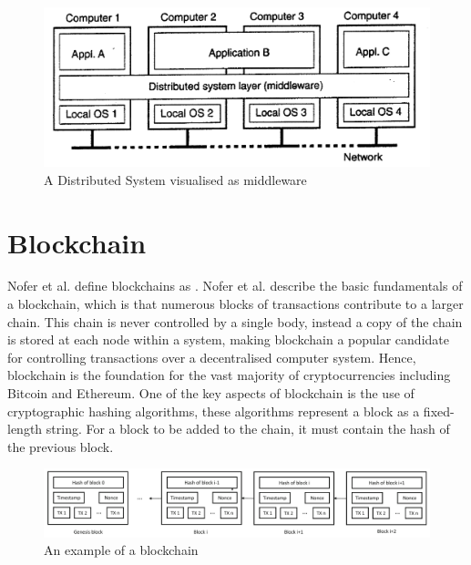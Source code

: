 \documentclass[a4paper, 11pt]{report}
\begin{document}
\begin{center}
	\begin{figure}[!htb]
		\includegraphics[width=\textwidth,keepaspectratio]{TanenbaumDistributed}
		\caption{A Distributed System visualised as \gls{middleware} \cite{tanenbaumdist}} 
		\label{fig:middleware}
	\end{figure}
\end{center}

\section{Blockchain}
Nofer et al. define \gls{blockchain}s as  \cite{blockchain}. Nofer et al. describe the basic fundamentals of a \gls{blockchain}, which is that numerous blocks of transactions contribute to a larger chain. This chain is never controlled by a single body, instead a copy of the chain is stored at each node within a system, making \gls{blockchain} a popular candidate for controlling transactions over a decentralised computer system. Hence, \gls{blockchain} is the foundation for the vast majority of cryptocurrencies including Bitcoin\cite{bitcoin} and Ethereum\cite{ethereum}. One of the key aspects of \gls{blockchain} is the use of cryptographic \gls{hashing} algorithms, these algorithms represent a block as a fixed-length string. For a block to be added to the chain, it must contain the hash of the previous block.

\begin{center}
	\begin{figure}[H]
		\includegraphics[width=\textwidth,keepaspectratio]{NoferBlock}
		\caption{An example of a \gls{blockchain} \cite{blockchain}} 
		\label{fig:blockchain}
	\end{figure}
\end{center}
\end{document}
